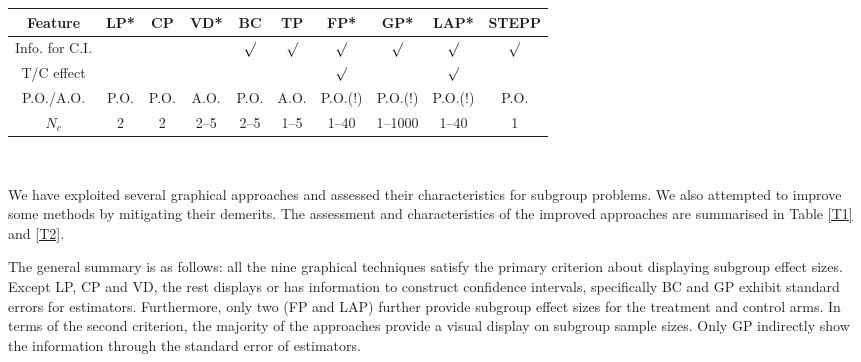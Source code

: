\documentclass[Afour,sagev,times, doublespace]{sagej}
\begin{document}
{\begin{table*}
\small\sf\centering
\caption{The feature summary of graphical techniques for subgroup problems. The abbeviation (Info. for C.I.) means whether there is available information to build a confidence interval; T/C effect means the approach presents the treatment effects of treatment/control arms; $N_c$ means the number of covariates for considerations; P.O./A.O. stands for pairwise overlay or all overlap for subgroups. The subscript * of some graphical approaches denote they have been improved. The exclamation mark denotes notable points.} \label{T2}
\begin{tabular}{cccccccccc}
\toprule
Feature               & LP*       & CP          & VD*      & BC       &TP           & FP*          & GP*             & LAP*           & STEPP \\
\midrule
Info. for C.I.        &           &             &          & $\surd$  & $\surd$     & $\surd$      & $\surd$         & $\surd$        & $\surd$     \\
T/C effect            &           &             &          &          &             & $\surd$      &                 & $\surd$        &       \\
P.O./A.O.             &  P.O.     & P.O.        &  A.O.    & P.O.     & A.O.        & P.O.(!)      & P.O.(!)         & P.O.(!)        & P.O. \\
$N_c$                 &  2        & 2           & 2--5     & 2--5     & 1--5        & 1--40        & 1--1000         & 1--40          & 1 \\
\bottomrule
\end{tabular}\\[10pt]
\end{table*}

We have exploited several graphical approaches and assessed their characteristics for subgroup problems. We also attempted to improve some methods by mitigating their demerits. The assessment and characteristics of the improved approaches are summarised in Table \ref{T1} and \ref{T2}.

The general summary is as follows: all the nine graphical techniques satisfy the primary criterion about displaying subgroup effect sizes. Except LP, CP and VD, the rest displays or has information to construct confidence intervals, specifically BC and GP exhibit standard errors for estimators. Furthermore, only two (FP and LAP) further provide subgroup effect sizes for the treatment and control arms. In terms of the second criterion, the majority of the approaches provide a visual display on subgroup sample sizes. Only GP indirectly show the information through the standard error of estimators.

}
\end{document}
